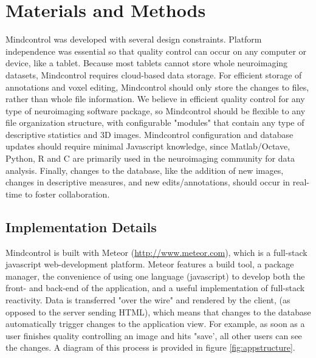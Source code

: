 \section{Materials and Methods}

Mindcontrol was developed with several design constraints. Platform independence was essential so that quality control can occur on any computer or device, like a tablet. Because most tablets cannot store whole neuroimaging datasets, Mindcontrol requires cloud-based data storage. For efficient storage of annotations and voxel editing, Mindcontrol should only store the changes to files, rather than whole file information. We believe in efficient quality control for any type of neuroimaging software package, so Mindcontrol should be flexible to any file organization structure, with configurable "modules" that contain any type of descriptive statistics and 3D images. Mindcontrol configuration and database updates should require minimal Javascript knowledge, since Matlab/Octave, Python, R and C are primarily used in the neuroimaging community for data analysis. Finally, changes to the database, like the addition of new images, changes in descriptive measures, and new edits/annotations, should occur in real-time to foster collaboration.  


\subsection{Implementation Details}

Mindcontrol is built with Meteor (\href{http://www.meteor.com}{http://www.meteor.com}), which is a full-stack javascript web-development platform. Meteor features a build tool, a package manager, the convenience of using one language (javascript) to develop both the front- and back-end of the application, and a useful implementation of full-stack reactivity. Data is transferred "over the wire" and rendered by the client, (as opposed to the server sending HTML), which means that changes to the database automatically trigger changes to the application view. For example, as soon as a user finishes quality controlling an image and hits "save', all other users can see the changes. A diagram of this process is provided in figure \ref{fig:appstructure}.



